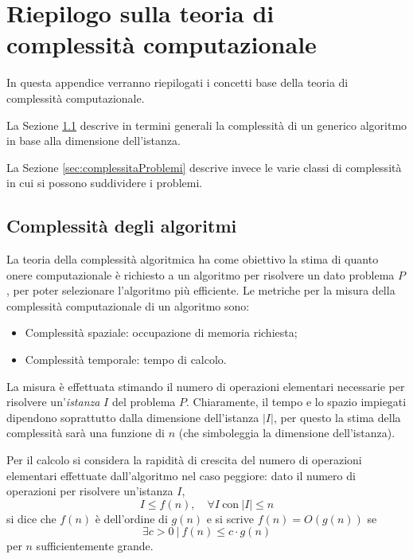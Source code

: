 \appendix
{}
\chapter[Riepilogo complessità computazionale]{Riepilogo sulla teoria di complessità 
computazionale}
\label{chap:appA}
In questa appendice verranno riepilogati i concetti base della teoria di complessità 
computazionale.

La Sezione \ref{sec:complessitaAlgoritmi} descrive in termini generali la 
complessità di un generico algoritmo in base alla dimensione dell'istanza.

La Sezione \ref{sec:complessitaProblemi} descrive invece le varie classi di complessità 
in cui si possono suddividere i problemi.


\section{Complessità degli algoritmi}
\label{sec:complessitaAlgoritmi}
La teoria della complessità algoritmica ha come obiettivo la stima di quanto onere 
computazionale è richiesto a un algoritmo per risolvere un dato problema $P$, per poter 
selezionare l'algoritmo più efficiente. Le metriche per la misura della complessità 
computazionale di un algoritmo sono:
\begin{itemize}
 \item Complessità spaziale: occupazione di memoria richiesta;
 \item Complessità temporale: tempo di calcolo.
\end{itemize}
La misura è effettuata stimando il numero di operazioni elementari necessarie per 
risolvere un'\emph{istanza} $I$ del problema $P$. Chiaramente, il tempo e lo spazio 
impiegati dipendono soprattutto dalla dimensione dell'istanza $\vert I \vert$, per questo 
la stima della complessità sarà una funzione di $n$ (che simboleggia la dimensione 
dell'istanza).

Per il calcolo si considera la rapidità di crescita del numero di operazioni elementari 
effettuate dall'algoritmo nel caso peggiore: dato il numero di operazioni per 
risolvere un'istanza $I$,
\begin{displaymath}
 I \leq f(n), \quad \forall I\  \text{con}\  \vert I \vert \leq n
\end{displaymath}
si dice che $f(n)$ è dell'ordine di $g(n)$ e si scrive $f(n) = O(g(n))$ se
\begin{equation}
 \exists c > 0\  \vert\  f(n) \leq c\cdot g(n)
\end{equation}
per $n$ sufficientemente grande.

